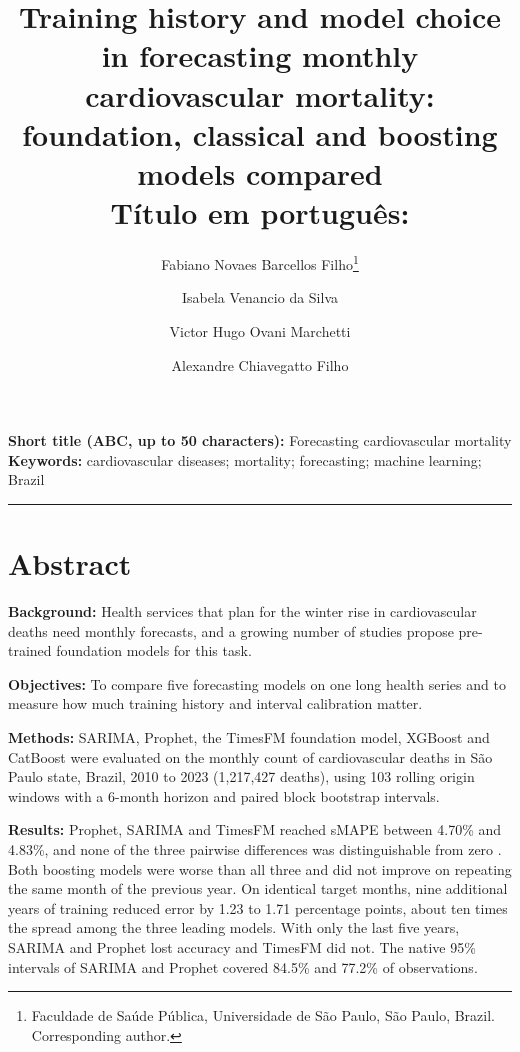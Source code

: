 

\title{\vspace{-2em}\large\bfseries Training history and model choice in forecasting monthly
cardiovascular mortality: foundation, classical and boosting models compared\\[0.4em]
\normalsize\mdseries T\'itulo em portugu\^es: }

\ifdefined\BLIND
\author{}
\else
\author{Fabiano Novaes Barcellos Filho\thanks{Faculdade de Sa\'ude P\'ublica, Universidade de
S\~ao Paulo, S\~ao Paulo, Brazil. Corresponding author.} \and
Isabela Venancio da Silva\footnotemark[1] \and
Victor Hugo Ovani Marchetti\footnotemark[1] \and
Alexandre Chiavegatto Filho\footnotemark[1]}
\fi

\date{}


\maketitle

\noindent\textbf{Short title (ABC, up to 50 characters):} Forecasting cardiovascular mortality \\
\textbf{Keywords:} cardiovascular diseases; mortality; forecasting; machine learning; Brazil 

\vspace{1em}
\hrule
\vspace{1em}

\section*{Abstract}

\textbf{Background:} Health services that plan for the winter rise in cardiovascular deaths need monthly forecasts, and a growing number of studies propose pre-trained foundation models for this task.

\textbf{Objectives:} To compare five forecasting models on one long health series and to measure how much training history and interval calibration matter.

\textbf{Methods:} SARIMA, Prophet, the TimesFM foundation model, XGBoost and CatBoost were evaluated on the monthly count of cardiovascular deaths in S\~ao Paulo state, Brazil, 2010 to 2023 (1{,}217{,}427 deaths), using 103 rolling origin windows with a 6-month horizon and paired block bootstrap intervals.

\textbf{Results:} Prophet, SARIMA and TimesFM reached sMAPE between 4.70\% and 4.83\%, and none of the three pairwise differences was distinguishable from zero . Both boosting models were worse than all three and did not improve on repeating the same month of the previous year. On identical target months, nine additional years of training reduced error by 1.23 to 1.71 percentage points, about ten times the spread among the three leading models. With only the last five years, SARIMA and Prophet lost accuracy and TimesFM did not. The native 95\% intervals of SARIMA and Prophet covered 84.5\% and 77.2\% of observations.

